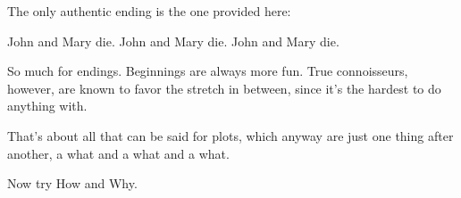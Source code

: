 \documentclass[10pt,a4paper]{article}
\begin{document}
The only authentic ending is the one provided here:

John and Mary die. John and Mary die. John and Mary die.

So much for endings. Beginnings are always more fun. True connoisseurs, however, are known to favor the stretch in between, since it's the hardest to do anything with.

That's about all that can be said for plots, which anyway are just one thing after another, a what and a what and a what.

Now try How and Why. 
\end{document}
